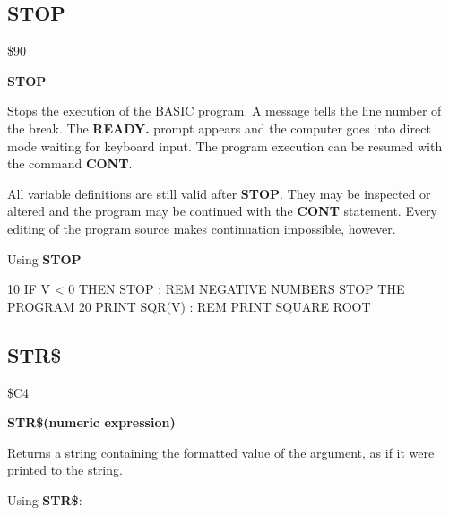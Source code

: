 \subsection{STOP}
\begin{description}[leftmargin=3cm,style=nextline]
\item [Token:] \$90
\item [Format:] {\bf STOP}
\item [Usage:] Stops the execution
               of the BASIC program.
               A message tells the line number of the break.
               The {\bf READY.} prompt
               appears and the computer goes into direct mode
               waiting for keyboard input.
               The program execution can be resumed with the command
               {\bf CONT}.

\item [Remarks:]
               All variable definitions are still valid after {\bf STOP}.
               They may be inspected or altered and the
               program may be continued with the {\bf CONT}
               statement. Every editing of the program source
               makes continuation impossible, however.

\item [Example:] Using {\bf STOP}
\begin{screenoutput}
10 IF V < 0 THEN STOP : REM NEGATIVE NUMBERS STOP THE PROGRAM
20 PRINT SQR(V)       : REM PRINT SQUARE ROOT
\end{screenoutput}
\end{description}


\newpage
\subsection{STR\$}
\begin{description}[leftmargin=3cm,style=nextline]
\item [Token:] \$C4
\item [Format:] {\bf STR\$(numeric expression)}
\item [Usage:] Returns a string
               containing the formatted value of the argument,
               as if it were printed to the string.

\item [Example:] Using {\bf STR\$}:
\end{description}


